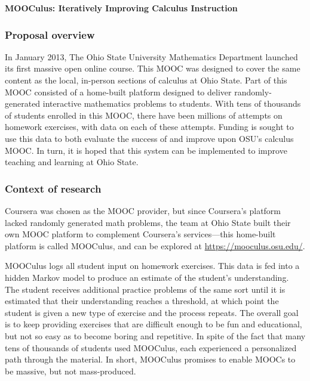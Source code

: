 \documentclass[12pt]{article}
\begin{document}
\begin{center}
  \textbf{MOOCulus: Iteratively Improving Calculus Instruction}
\end{center}

\subsubsection*{Proposal overview}

In January 2013, The Ohio State University Mathematics Department
launched its first massive open online course. This MOOC was designed
to cover the same content as the local, in-person sections of calculus
at Ohio State. Part of this MOOC consisted of a home-built platform
designed to deliver randomly-generated interactive mathematics
problems to students. With tens of thousands of students enrolled in
this MOOC, there have been millions of attempts on homework exercises,
with data on each of these attempts.  Funding is sought to use this
data to both evaluate the success of and improve upon OSU's calculus
MOOC. In turn, it is hoped that this system can be implemented to
improve teaching and learning at Ohio State.


\subsubsection*{Context of research}

Coursera was chosen as the MOOC provider, but since Coursera's
platform lacked randomly generated math problems, the team at Ohio
State built their own MOOC platform to complement Coursera's
services---this home-built platform is called MOOCulus, and can be
explored at \url{https://mooculus.osu.edu/}.

MOOCulus logs all student input on homework exercises. This data is
fed into a hidden Markov model to produce an estimate of the student's
understanding. The student receives additional practice problems of
the same sort until it is estimated that their understanding reaches a
threshold, at which point the student is given a new type of exercise
and the process repeats.  The overall goal is to keep providing
exercises that are difficult enough to be fun and educational, but not
so easy as to become boring and repetitive.  In spite of the fact that
many tens of thousands of students used MOOCulus, each experienced a
personalized path through the material.  In short, MOOCulus promises
to enable MOOCs to be massive, but not mass-produced.
\end{document}
